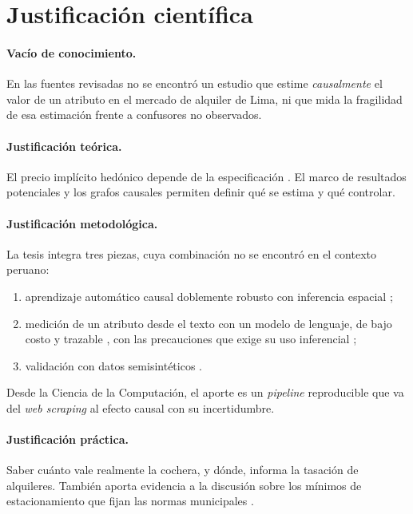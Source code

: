 \section{Justificación científica}\label{sec:justif}

\paragraph{Vacío de conocimiento.} En las fuentes revisadas no se encontró un estudio que estime \emph{causalmente} el valor de un atributo en el mercado de alquiler de Lima, ni que mida la fragilidad de esa estimación frente a confusores no observados.

\paragraph{Justificación teórica.} El precio implícito hedónico \citep{rosen1974} depende de la especificación \citep{sirmans2005}. El marco de resultados potenciales y los grafos causales \citep{pearl2009,imbens2015} permiten definir qué se estima y qué controlar.

\paragraph{Justificación metodológica.} La tesis integra tres piezas, cuya combinación no se encontró en el contexto peruano:
\begin{enumerate}[label=(\roman*)]
\item aprendizaje automático causal doblemente robusto con inferencia espacial \citep{chernozhukov2018};
\item medición de un atributo desde el texto con un modelo de lenguaje, de bajo costo y trazable \citep{faxvaag2026}, con las precauciones que exige su uso inferencial \citep{egami2023};
\item validación con datos semisintéticos \citep{advani2019}.
\end{enumerate}
Desde la Ciencia de la Computación, el aporte es un \textit{pipeline} reproducible que va del \textit{web scraping} al efecto causal con su incertidumbre.

\paragraph{Justificación práctica.} Saber cuánto vale realmente la cochera, y dónde, informa la tasación de alquileres. También aporta evidencia a la discusión sobre los mínimos de estacionamiento que fijan las normas municipales \citep{miraflores2011,sanisidro2020}.

